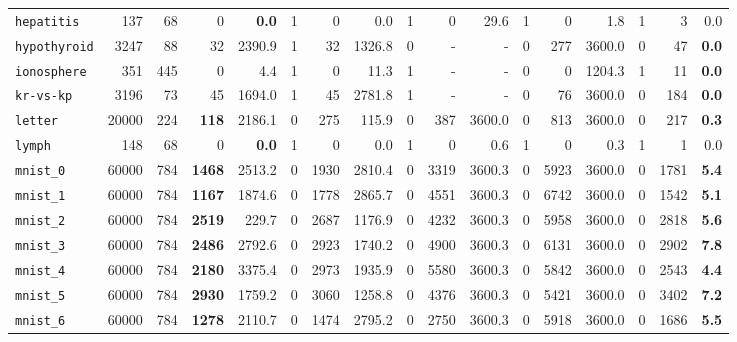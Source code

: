 \begin{tabular}{lccrrrrrrrrrrrrrr}
\texttt{hepatitis} & \multicolumn{1}{r}{137} & \multicolumn{1}{r}{68}  & 0 & \textbf{0.0} & 1 & 0 & 0.0 & 1 & 0 & 29.6 & 1 & 0 & 1.8 & 1 & 3 & 0.0\\
\texttt{hypothyroid} & \multicolumn{1}{r}{3247} & \multicolumn{1}{r}{88}  & 32 & 2390.9 & 1 & 32 & 1326.8 & 0 & - & - & 0 & 277 & 3600.0 & 0 & 47 & \textbf{0.0}\\
\texttt{ionosphere} & \multicolumn{1}{r}{351} & \multicolumn{1}{r}{445}  & 0 & 4.4 & 1 & 0 & 11.3 & 1 & - & - & 0 & 0 & 1204.3 & 1 & 11 & \textbf{0.0}\\
\texttt{kr-vs-kp} & \multicolumn{1}{r}{3196} & \multicolumn{1}{r}{73}  & 45 & 1694.0 & 1 & 45 & 2781.8 & 1 & - & - & 0 & 76 & 3600.0 & 0 & 184 & \textbf{0.0}\\
\texttt{letter} & \multicolumn{1}{r}{20000} & \multicolumn{1}{r}{224}  & \textbf{118} & 2186.1 & 0 & 275 & 115.9 & 0 & 387 & 3600.0 & 0 & 813 & 3600.0 & 0 & 217 & \textbf{0.3}\\
\texttt{lymph} & \multicolumn{1}{r}{148} & \multicolumn{1}{r}{68}  & 0 & \textbf{0.0} & 1 & 0 & 0.0 & 1 & 0 & 0.6 & 1 & 0 & 0.3 & 1 & 1 & 0.0\\
\texttt{mnist\_0} & \multicolumn{1}{r}{60000} & \multicolumn{1}{r}{784}  & \textbf{1468} & 2513.2 & 0 & 1930 & 2810.4 & 0 & 3319 & 3600.3 & 0 & 5923 & 3600.0 & 0 & 1781 & \textbf{5.4}\\
\texttt{mnist\_1} & \multicolumn{1}{r}{60000} & \multicolumn{1}{r}{784}  & \textbf{1167} & 1874.6 & 0 & 1778 & 2865.7 & 0 & 4551 & 3600.3 & 0 & 6742 & 3600.0 & 0 & 1542 & \textbf{5.1}\\
\texttt{mnist\_2} & \multicolumn{1}{r}{60000} & \multicolumn{1}{r}{784}  & \textbf{2519} & 229.7 & 0 & 2687 & 1176.9 & 0 & 4232 & 3600.3 & 0 & 5958 & 3600.0 & 0 & 2818 & \textbf{5.6}\\
\texttt{mnist\_3} & \multicolumn{1}{r}{60000} & \multicolumn{1}{r}{784}  & \textbf{2486} & 2792.6 & 0 & 2923 & 1740.2 & 0 & 4900 & 3600.3 & 0 & 6131 & 3600.0 & 0 & 2902 & \textbf{7.8}\\
\texttt{mnist\_4} & \multicolumn{1}{r}{60000} & \multicolumn{1}{r}{784}  & \textbf{2180} & 3375.4 & 0 & 2973 & 1935.9 & 0 & 5580 & 3600.3 & 0 & 5842 & 3600.0 & 0 & 2543 & \textbf{4.4}\\
\texttt{mnist\_5} & \multicolumn{1}{r}{60000} & \multicolumn{1}{r}{784}  & \textbf{2930} & 1759.2 & 0 & 3060 & 1258.8 & 0 & 4376 & 3600.3 & 0 & 5421 & 3600.0 & 0 & 3402 & \textbf{7.2}\\
\texttt{mnist\_6} & \multicolumn{1}{r}{60000} & \multicolumn{1}{r}{784}  & \textbf{1278} & 2110.7 & 0 & 1474 & 2795.2 & 0 & 2750 & 3600.3 & 0 & 5918 & 3600.0 & 0 & 1686 & \textbf{5.5}\\

\end{tabular}
